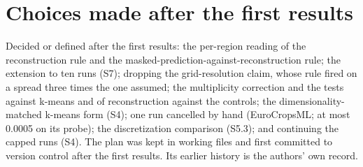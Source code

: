 \documentclass[10pt]{article}
\begin{document}
\section{Choices made after the first results}

Decided or defined after the first results: the per-region reading of the reconstruction rule and the masked-prediction-against-reconstruction rule; the extension to ten runs (S7); dropping the grid-resolution claim, whose rule fired on a spread three times the one assumed; the multiplicity correction and the tests against k-means and of reconstruction against the controls; the dimensionality-matched k-means form (S4); one run cancelled by hand (EuroCropsML; at most 0.0005 on its probe); the discretization comparison (S5.3); and continuing the capped runs (S4). The plan was kept in working files and first committed to version control after the first results. Its earlier history is the authors' own record.
\end{document}
